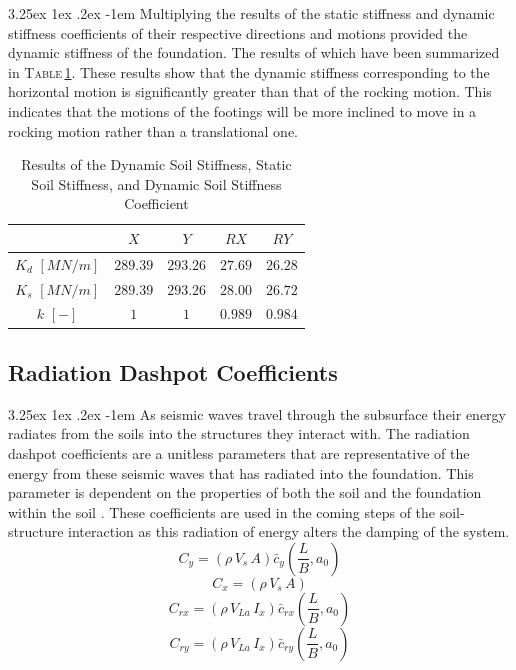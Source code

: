 \documentclass[11pt,a4paper,titlepage]{report}
\makeatletter
\renewcommand\paragraph{\@startsection{paragraph}{5}{\z@}%
  {3.25ex \@plus1ex \@minus.2ex}%
  {-1em}%
  {\normalfont\normalsize\bfseries}}
\makeatother
\begin{document}
\paragraph{}Multiplying the results of the static stiffness and dynamic stiffness coefficients of their respective directions and motions provided the dynamic stiffness of the foundation. The results of which have been summarized in \textsc{Table}\,\ref{tab:dynamic soil stiffness}. These results show that the dynamic stiffness corresponding to the horizontal motion is significantly greater than that of the rocking motion. This indicates that the motions of the footings will be more inclined to move in a rocking motion rather than a translational one.
\begin{table}[h]
    \centering
    \begin{tabular}{c|c|c|c|c}
         & $X$ & $Y$ & $RX$ & $RY$  \\
         \hline
       $K_d$ $[MN/m]$  & $289.39$ & $293.26$ & $27.69$ & $26.28$ \\
       $K_s$ $[MN/m]$ & $289.39$ & $293.26$ & $28.00$ & $26.72$ \\
       $k$ $[-]$ & $1$ & $1$ & $0.989$ & $0.984$ \\
    \end{tabular}
    \caption{Results of the Dynamic Soil Stiffness, Static Soil Stiffness, and Dynamic Soil Stiffness Coefficient}
    \label{tab:dynamic soil stiffness}
\end{table}
\subsection{Radiation Dashpot Coefficients} 
\paragraph{}As seismic waves travel through the subsurface their energy radiates from the soils into the structures they interact with. The radiation dashpot coefficients are a unitless parameters that are representative of the energy from these seismic waves that has radiated into the foundation. This parameter is dependent on the properties of both the soil and the foundation within the soil \cite{Myk}. These coefficients are used in the coming steps of the soil-structure interaction as this radiation of energy alters the damping of the system.
\begin{equation}
    C_y=(\rho\,V_s\,A)\bar{c}_y\left(\frac{L}{B},a_0\right)
    \label{eq:I.5 dashpot coefficient Y}
\end{equation}
\begin{equation}
    C_x=(\rho\,V_s\,A)
    \label{eq:I.5 dashpot coefficient X}
\end{equation}
\begin{equation}
    C_{rx}=(\rho\,V_{La}\,I_x)\bar{c}_{rx}\left(\frac{L}{B},a_0\right)
    \label{eq:I.5 dashpot coefficient RX}
\end{equation}
\begin{equation}
    C_{ry}=(\rho\,V_{La}\,I_x)\bar{c}_{ry}\left(\frac{L}{B},a_0\right)
    \label{eq:I.5 dashpot coefficient RY}
\end{equation}
\end{document}

